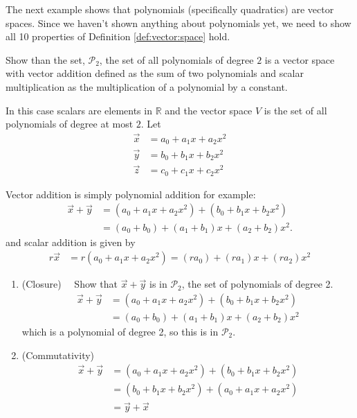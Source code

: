 The next example shows that polynomials (specifically quadratics) are vector spaces.  Since we haven't shown anything about polynomials yet, we need to show all 10 properties of Definition \ref{def:vector:space} hold.  

\begin{example}
Show than the set, $\mathcal{P}_2$, the set of all polynomials of degree $2$ is a vector space with vector addition defined as the sum of two polynomials and scalar multiplication as the multiplication of a polynomial by a constant.  

\solution


In this case scalars are elements in $\mathbb{R}$ and the vector space $V$ is the set of all polynomials of degree at most $2$.   Let 
\begin{align*}
 \vec{x} & = a_0 + a_1 x + a_2 x^2 \\
 \vec{y} & = b_0 + b_1 x + b_2 x^2 \\
 \vec{z} & = c_0 + c_1 x + c_2 x^2 
\end{align*}
  
Vector addition is simply polynomial addition for example:
%
\begin{align*}
\vec{x} + \vec{y} & = (a_0 + a_1 x + a_2 x^2) + (b_0 + b_1 x + b_2 x^2) \\
& = (a_0 + b_0) + (a_1 + b_1) x + (a_2 + b_2) x^2.  
\end{align*}
and scalar addition is given by 
%
\begin{align*}
r \vec{x} & = r(a_0 + a_1 x + a_2 x^2) = (ra_0) + (ra_1) x + (ra_2) x^2
\end{align*}  
  
\begin{enumerate}
\item (Closure)~~ Show that $\vec{x}+\vec{y}$ is in $\mathcal{P}_2$, the set of polynomials of degree 2. 
\begin{align*}
\vec{x} + \vec{y} & = (a_0 + a_1 x + a_2 x^2) + (b_0 + b_1 x+ b_2 x^2) \\
& = (a_0 + b_0) + (a_1 + b_1) x + (a_2 + b_2) x^2 
\end{align*}
which is a polynomial of degree 2, so this is in $\mathcal{P}_2$. 

 \item (Commutativity)  
\begin{align*}
 \vec{x} + \vec{y} & = (a_0 + a_1 x + a_2 x^2) + (b_0 + b_1 x +b_2 x^2) \\
 & = (b_0 + b_1 x + b_2 x^2) + (a_0 + a_1 x +  a_2 x^2) \\
 & = \vec{y} + \vec{x} 
\end{align*}


\end{enumerate}
\end{example}
